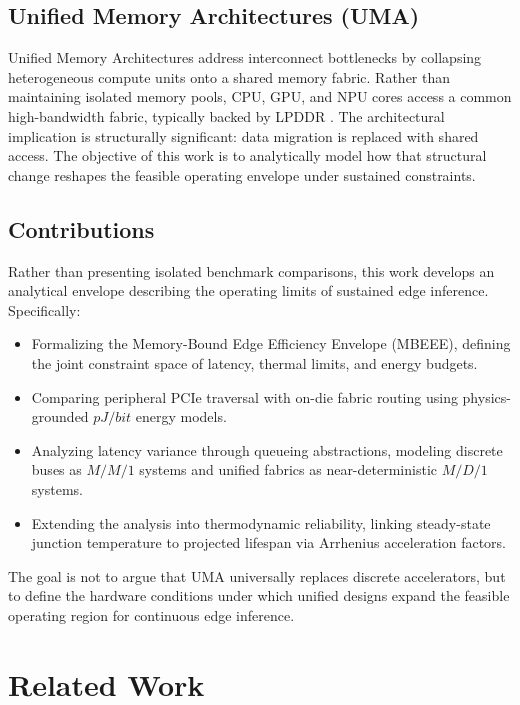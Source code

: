 \documentclass[conference]{IEEEtran}
\begin{document}
\subsection{Unified Memory Architectures (UMA)}
Unified Memory Architectures address interconnect bottlenecks by collapsing heterogeneous compute units onto a shared memory fabric. Rather than maintaining isolated memory pools, CPU, GPU, and NPU cores access a common high-bandwidth fabric, typically backed by LPDDR \cite{b16, b11}. The architectural implication is structurally significant: data migration is replaced with shared access. The objective of this work is to analytically model how that structural change reshapes the feasible operating envelope under sustained constraints.

\subsection{Contributions}
Rather than presenting isolated benchmark comparisons, this work develops an analytical envelope describing the operating limits of sustained edge inference. Specifically:
\begin{itemize}
    \item Formalizing the Memory-Bound Edge Efficiency Envelope (MBEEE), defining the joint constraint space of latency, thermal limits, and energy budgets.
    \item Comparing peripheral PCIe traversal with on-die fabric routing using physics-grounded $pJ/bit$ energy models.
    \item Analyzing latency variance through queueing abstractions, modeling discrete buses as $M/M/1$ systems and unified fabrics as near-deterministic $M/D/1$ systems.
    \item Extending the analysis into thermodynamic reliability, linking steady-state junction temperature to projected lifespan via Arrhenius acceleration factors.
\end{itemize}
The goal is not to argue that UMA universally replaces discrete accelerators, but to define the hardware conditions under which unified designs expand the feasible operating region for continuous edge inference.

\section{Related Work}
\end{document}

